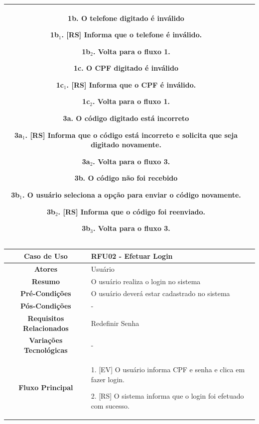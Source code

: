 \begin{apendicesenv}
\begin{quadro}[htb]
\begin{tabular}{|c|p{11cm}|}
{			\textbf{1b. O telefone digitado é inválido}\par
			1b$_1$. [RS] Informa que o telefone é inválido.\par
			1b$_2$. Volta para o fluxo 1.\par
			
			\textbf{1c. O CPF digitado é inválido}\par
			1c$_1$. [RS] Informa que o CPF é inválido.\par
			1c$_2$. Volta para o fluxo 1.\par
			
			\textbf{3a. O código digitado está incorreto}\par
			3a$_1$. [RS] Informa que o código está incorreto e solicita que seja digitado novamente.\par
			3a$_2$. Volta para o fluxo 3.\par
			
			\textbf{3b. O código não foi recebido}\par
			3b$_1$. O usuário seleciona a opção para enviar o código novamente.\par
			3b$_2$. [RS] Informa que o código foi reenviado.\par
			3b$_3$. Volta para o fluxo 3.
		}
		\\ \hline
	\end{tabular}
	
\end{quadro}

\begin{quadro}[htb]
	\centering
	\caption{\label{quadro_rfu02}Caso de Uso Efetuar Login (Baixo Nível)}
	\small
	\renewcommand{\arraystretch}{1.1}
	
	\begin{tabular}{|c|p{11cm}|}
		\hline
		\textbf{Caso de Uso} & RFU02 - Efetuar Login \\ \hline
		\textbf{Atores} & Usuário \\ \hline
		\textbf{Resumo} & O usuário realiza o login no sistema \\ \hline
		\textbf{Pré-Condições} & O usuário deverá estar cadastrado no sistema \\ \hline
		\textbf{Pós-Condições} & - \\ \hline
		\textbf{Requisitos Relacionados} & Redefinir Senha \\ \hline
		\textbf{Variações Tecnológicas} & - \\ \hline
		
		\textbf{Fluxo Principal} &
		\parbox[t]{11cm}{
			\raggedright
			1. [EV] O usuário informa CPF e senha e clica em fazer login.\par
			2. [RS] O sistema informa que o login foi efetuado com sucesso.
		}
		\\ \hline
		

\end{tabular}
\end{quadro}
\end{apendicesenv}
